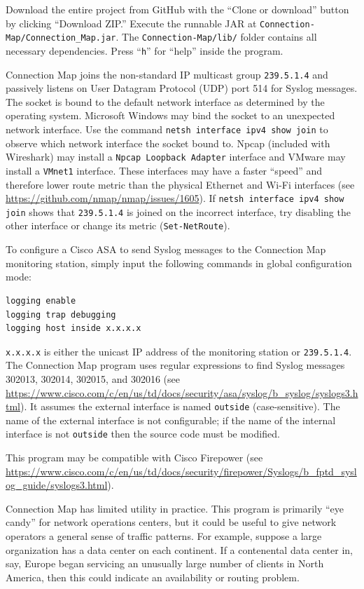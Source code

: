 \documentclass[12pt]{article}
\begin{document}
Download the entire project from GitHub with the ``Clone or download'' button by clicking ``Download ZIP.'' Execute the runnable JAR at \texttt{Connection-Map/Connection\_Map.jar}.
The \texttt{Connection-Map/lib/} folder contains all necessary dependencies.
Press ``\texttt{h}'' for ``help'' inside the program.

Connection Map joins the non-standard IP multicast group \texttt{239.5.1.4} and passively listens on User Datagram Protocol (UDP) port 514 for Syslog messages.
The socket is bound to the default network interface as determined by the operating system.
Microsoft Windows may bind the socket to an unexpected network interface.
Use the command \texttt{netsh interface ipv4 show join} to observe which network interface the socket bound to.
Npcap (included with Wireshark) may install a \texttt{Npcap Loopback Adapter} interface and VMware may install a \texttt{VMnet1} interface.
These interfaces may have a faster ``speed'' and therefore lower route metric than the physical Ethernet and Wi-Fi interfaces (see \url{https://github.com/nmap/nmap/issues/1605}).
If \texttt{netsh interface ipv4 show join} shows that \texttt{239.5.1.4} is joined on the incorrect interface, try disabling the other interface or change its metric (\texttt{Set-NetRoute}).

To configure a Cisco ASA to send Syslog messages to the Connection Map monitoring station, simply input the following commands in global configuration mode:

\begin{lstlisting}
logging enable
logging trap debugging
logging host inside x.x.x.x
\end{lstlisting}

\texttt{x.x.x.x} is either the unicast IP address of the monitoring station or \texttt{239.5.1.4}.
The Connection Map program uses regular expressions to find Syslog messages 302013, 302014, 302015, and 302016 (see \url{https://www.cisco.com/c/en/us/td/docs/security/asa/syslog/b_syslog/syslogs3.html}).
It assumes the external interface is named \texttt{outside} (case-sensitive).
The name of the external interface is not configurable; if the name of the internal interface is not \texttt{outside} then the source code must be modified.

This program may be compatible with Cisco Firepower (see \url{https://www.cisco.com/c/en/us/td/docs/security/firepower/Syslogs/b_fptd_syslog_guide/syslogs3.html}).

Connection Map has limited utility in practice.
This program is primarily ``eye candy'' for network operations centers, but it could be useful to give network operators a general sense of traffic patterns.
For example, suppose a large organization has a data center on each continent.
If a contenental data center in, say, Europe began servicing an unusually large number of clients in North America, then this could indicate an availability or routing problem.
\end{document}
